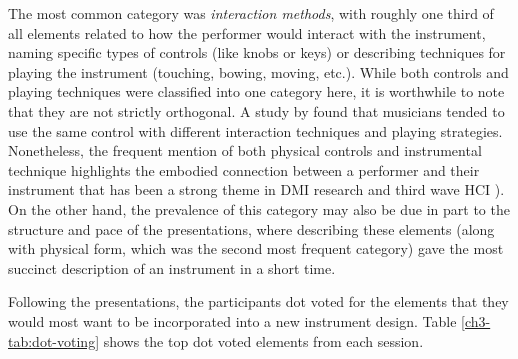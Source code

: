 \documentclass[letterpaper, 12pt]{article}
\begin{document}
The most common category was \emph{interaction methods}, with roughly one third of all elements related to how the performer would interact with the instrument, naming specific types of controls (like knobs or keys) or describing techniques for playing the instrument (touching, bowing, moving, etc.). While both controls and playing techniques were classified into one category here, it is worthwhile to note that they are not strictly orthogonal. A study by \citep{Marshall2009b} found that musicians tended to use the same control with different interaction techniques and playing strategies. Nonetheless, the frequent mention of both physical controls and instrumental technique highlights the embodied connection between a performer and their instrument that has been a strong theme in DMI research \citep{Emerson2018,Magnusson2007} and third wave HCI \citep{Harrison2007}). On the other hand, the prevalence of this category may also be due in part to the structure and pace of the presentations, where describing these elements (along with physical form, which was the second most frequent category) gave the most succinct description of an instrument in a short time. 



Following the presentations, the participants dot voted for the elements that they would most want to be incorporated into a new instrument design. Table \ref{ch3-tab:dot-voting} shows the top dot voted elements from each session. 
\end{document}
